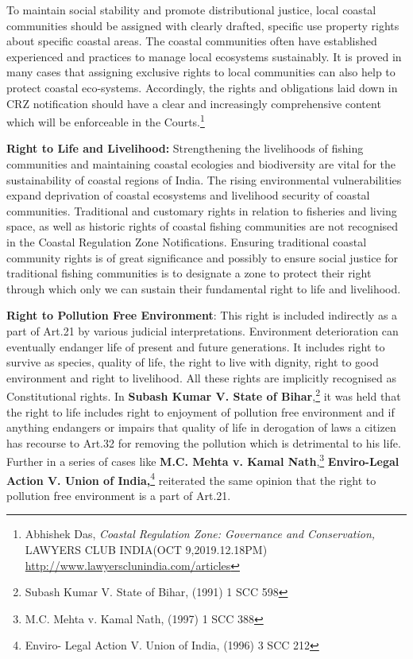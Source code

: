 \begin{multicols}{2}
\noi
To maintain social stability and promote distributional justice, local coastal communities
should be assigned with clearly drafted, specific use property rights about specific coastal
areas. The coastal communities often have established experienced and practices to
manage local ecosystems sustainably. It is proved in many cases that assigning exclusive 
rights to local communities can also help to protect coastal eco-systems. Accordingly, the
rights and obligations laid down in CRZ notification should have a clear and increasingly
comprehensive content which will be enforceable in the Courts.\footnote{Abhishek Das, \textit{Coastal Regulation Zone: Governance and Conservation,} LAWYERS CLUB INDIA(OCT 9,2019.12.18PM) \url{http://www.lawyersclunindia.com/articles}}


\noi
{\large\bfseries Right to Life and Livelihood:} Strengthening the livelihoods of fishing
communities and maintaining coastal ecologies and biodiversity are vital for the
sustainability of coastal regions of India. The rising environmental vulnerabilities expand
deprivation of coastal ecosystems and livelihood security of coastal communities. Traditional
and customary rights in relation to fisheries and living space, as well as historic rights of
coastal fishing communities are not recognised in the Coastal Regulation Zone Notifications.
Ensuring traditional coastal community rights is of great significance and possibly to ensure
social justice for traditional fishing communities is to designate a zone to protect their right
through which only we can sustain their fundamental right to life and livelihood.

\noi
{\large\bfseries Right to Pollution Free Environment}: This right is included indirectly as a
part of Art.21 by various judicial interpretations. Environment deterioration can eventually
endanger life of present and future generations. It includes right to survive as species, quality
of life, the right to live with dignity, right to good environment and right to livelihood. All
these rights are implicitly recognised as Constitutional rights. In \textbf{Subash Kumar V. State of
Bihar},\footnote{Subash Kumar V. State of Bihar, (1991) 1 SCC 598} it was held that the right to life includes right to enjoyment of pollution free
environment and if anything endangers or impairs that quality of life in derogation of laws a
citizen has recourse to Art.32 for removing the pollution which is detrimental to his life.
Further in a series of cases like \textbf{M.C. Mehta v. Kamal Nath},\footnote{M.C. Mehta v. Kamal Nath, (1997) 1 SCC 388} \textbf{Enviro-Legal Action V.
Union of India,}\footnote{Enviro- Legal Action V. Union of India, (1996) 3 SCC 212} reiterated the same opinion that the right to pollution free environment is a
part of Art.21.


\end{multicols}
